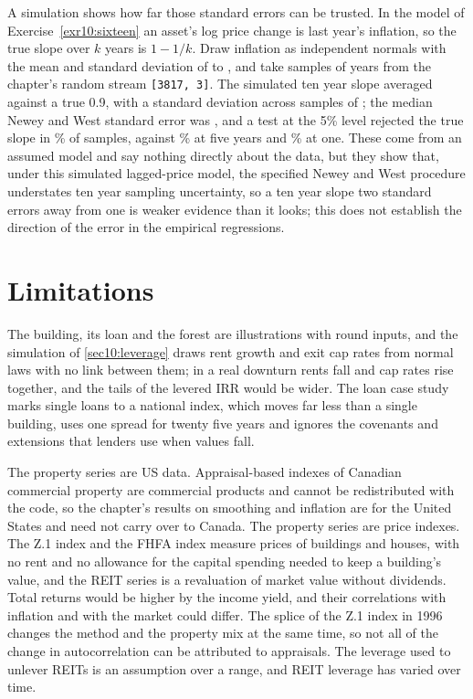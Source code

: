 \begin{chapterrefs}
A simulation shows how far those standard errors can be trusted. In the model of
Exercise~\ref{exr10:sixteen} an asset's log price change is last year's inflation, so the true slope
over $k$ years is $1-1/k$. Draw inflation as independent normals with the mean and standard deviation of
\ihFirst{} to \ihLast, and take \lsN{} samples of \lsT{} years from the chapter's random stream
\texttt{[3817, 3]}. The simulated ten year slope averaged \lsMeanTen{} against a true 0.9, with a standard
deviation across samples of \lsSdTen; the median Newey and West standard error was \lsSeTen, and a test at
the 5\% level rejected the true slope in \lsRejTen\% of samples, against \lsRejFive\% at five years and
\lsRejOne\% at one. These come from an assumed model and say nothing directly about the data, but they show that,
under this simulated lagged-price model, the specified Newey and West procedure understates ten year
sampling uncertainty, so a ten year slope two standard errors away from one is weaker evidence than it
looks; this does not establish the direction of the error in the empirical regressions.

\FloatBarrier
\section{Limitations}
\label{sec10:limits}

The building, its loan and the forest are illustrations with round inputs, and the simulation of
\cref{sec10:leverage} draws rent growth and exit cap rates from normal laws with no link between them; in a
real downturn rents fall and cap rates rise together, and the tails of the levered IRR would be wider. The
loan case study marks single loans to a national index, which moves far less than a single building, uses
one spread for twenty five years and ignores the covenants and extensions that lenders use when values fall.

The property series are US data. Appraisal-based indexes of Canadian commercial property are commercial
products and cannot be redistributed with the code, so the chapter's results on smoothing and
inflation are for the United States and need not carry over to Canada. The property series are price indexes. The Z.1 index and the FHFA index measure prices of buildings
and houses, with no rent and no allowance for the capital spending needed to keep a building's value,
and the REIT series is a revaluation of market value without dividends. Total returns would be higher by
the income yield, and their correlations with inflation and with the market could differ. The splice of
the Z.1 index in 1996 changes the method and the property mix at the same time, so not all of the change in
autocorrelation can be attributed to appraisals. The leverage used to unlever REITs is an assumption
over a range, and REIT leverage has varied over time.


\end{chapterrefs}

